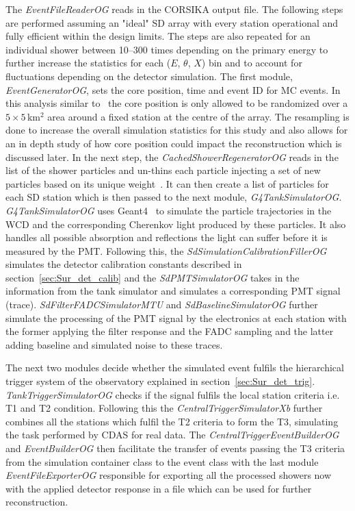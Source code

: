 The \textit{EventFileReaderOG} reads in the CORSIKA output file. The following steps are performed assuming an "ideal" SD array with every station operational and fully efficient within the design limits. The steps are also repeated for an individual shower between 10–300 times depending on the primary energy to further increase the statistics for each ($E$, $\theta$, $X$) bin and to account for fluctuations depending on the detector simulation. The first module, \textit{EventGeneratorOG}, sets the core position, time and event ID for MC events. In this analysis similar to~\cite{gap_note_2013} the core position is only allowed to be randomized over a $5\times5$\,km$^2$ area around a fixed station at the centre of the array. The resampling is done to increase the overall simulation statistics for this study and also allows for an in depth study of how core position could impact the reconstruction which is discussed later. In the next step, the \textit{CachedShowerRegeneratorOG} reads in the list of the shower particles and un-thins each particle injecting a set of new particles based on its unique weight~\cite{Stokes:2011wf}. It can then create a list of particles for each SD station which is then passed to the next module, \textit{G4TankSimulatorOG}. \textit{G4TankSimulatorOG} uses Geant4~\cite{GEANT4:2002zbu,Allison:2006ve,Allison:2016lfl} to simulate the particle trajectories in the WCD and the corresponding Cherenkov light produced by these particles. It also handles all possible absorption and reflections the light can suffer before it is measured by the PMT. Following this, the \textit{SdSimulationCalibrationFillerOG} simulates the detector calibration constants described in section~\ref{sec:Sur_det_calib} and the \textit{SdPMTSimulatorOG} takes in the information from the tank simulator and simulates a corresponding PMT signal (trace). \textit{SdFilterFADCSimulatorMTU} and \textit{SdBaselineSimulatorOG} further simulate the processing of the PMT signal by the electronics at each station with the former applying the filter response and the FADC sampling and the latter adding baseline and simulated noise to these traces. 

The next two modules decide whether the simulated event fulfils the hierarchical trigger system of the observatory explained in section~\ref{sec:Sur_det_trig}. \textit{TankTriggerSimulatorOG} checks if the signal fulfils the local station criteria i.e. T1 and T2 condition. Following this the \textit{CentralTriggerSimulatorXb} further combines all the stations which fulfil the T2 criteria to form the T3, simulating the task performed by CDAS for real data. The \textit{CentralTriggerEventBuilderOG} and \textit{EventBuilderOG} then facilitate the transfer of events passing the T3 criteria from the simulation container class to the event class with the last module \textit{EventFileExporterOG} responsible for exporting all the processed showers now with the applied detector response in a file which can be used for further reconstruction.  



